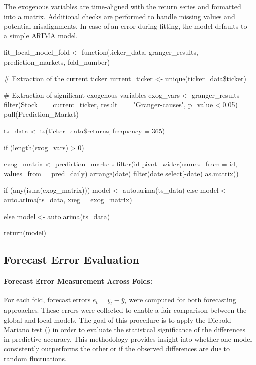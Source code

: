 \documentclass[12pt]{report}
\begin{document}
The exogenous variables are time-aligned with the return series and formatted into a matrix. Additional checks are performed to handle missing values and potential misalignments. In case of an error during fitting, the model defaults to a simple ARIMA model.

\newpage
\begin{code}[caption={Modélisation locale ARIMA/ARIMAX pour chaque action}]
fit_local_model_fold <- function(ticker_data, granger_results, prediction_markets, fold_number) {
  # Extraction of the current ticker
  current_ticker <- unique(ticker_data\$ticker)
  
  # Extraction of significant exogenous variables
  exog_vars <- granger_results %
    filter(Stock == current_ticker, result == "Granger-causes", p_value < 0.05) %
    pull(Prediction_Market)

  ts_data <- ts(ticker_data\$returns, frequency = 365)

  if (length(exog_vars) > 0) {
    exog_matrix <- prediction_markets %
      filter(id %
      pivot_wider(names_from = id, values_from = pred_daily) %
      arrange(date) %
      filter(date %
      select(-date) %
      as.matrix()

    if (any(is.na(exog_matrix))) {
      model <- auto.arima(ts_data)
    } else {
      model <- auto.arima(ts_data, xreg = exog_matrix)
    }
  } else {
    model <- auto.arima(ts_data)
  }

  return(model)
}
\end{code}

\subsection{Forecast Error Evaluation}
\paragraph{Forecast Error Measurement Across Folds:}
For each fold, forecast errors \( e_t = y_t - \hat{y}_t \) were computed for both forecasting approaches. These errors were collected to enable a fair comparison between the global and local models. The goal of this procedure is to apply the Diebold-Mariano test (\cite{diebold1995comparing}) in order to evaluate the statistical significance of the differences in predictive accuracy. This methodology provides insight into whether one model consistently outperforms the other or if the observed differences are due to random fluctuations.
\end{document}
